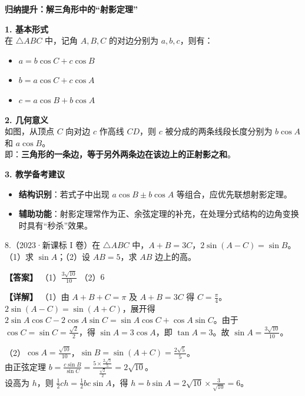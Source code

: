 \documentclass[UTF8,10pt,aspectratio=169]{ctexbeamer}
\begin{document}
	\begin{frame}
		\begin{center}
			{\Large \textbf{归纳提升：解三角形中的“射影定理”}}
		\end{center}
		\vspace{0.4cm}
		
		\textbf{1. 基本形式} \\
		在 $\triangle ABC$ 中，记角 $A, B, C$ 的对边分别为 $a, b, c$，则有：
		\begin{itemize}
			\item $a = b \cos C + c \cos B$
			\item $b = a \cos C + c \cos A$
			\item $c = a \cos B + b \cos A$
		\end{itemize}
		
		\vspace{0.3cm}
		\pause
		\textbf{2. 几何意义} \\
		
		如图，从顶点 $C$ 向对边 $c$ 作高线 $CD$，则 $c$ 被分成的两条线段长度分别为 $b\cos A$ 和 $a\cos B$。\\
		即：\textbf{三角形的一条边，等于另外两条边在该边上的正射影之和}。
		
		\vspace{0.3cm}
		\pause
		\textbf{3. 教学备考建议} \\
		\begin{itemize}
			\item \textbf{结构识别}：若式子中出现 $a\cos B \pm b\cos A$ 等组合，应优先联想射影定理。
			\item \textbf{辅助功能}：射影定理常作为正、余弦定理的补充，在处理分式结构的边角变换时具有“秒杀”效果。
		\end{itemize}
	\end{frame}
	
	\begin{frame}
		8.（2023·新课标 I 卷）在 $\triangle ABC$ 中，$A + B = 3C$，$2\sin(A-C) = \sin B$。\\
		（1）求 $\sin A$；\quad （2）设 $AB = 5$，求 $AB$ 边上的高。
		
		\vspace{0.3cm}
		\pause
		\textbf{【答案】} （1）$\frac{3\sqrt{10}}{10}$ \quad （2）$6$
		
		\vspace{0.2cm}
		\textbf{【详解】} 
		（1）由 $A+B+C=\pi$ 及 $A+B=3C$ 得 $C=\frac{\pi}{4}$。\\
		$2\sin(A-C) = \sin(A+C)$，展开得 $2\sin A\cos C - 2\cos A\sin C = \sin A\cos C + \cos A\sin C$。由于 $\cos C = \sin C = \frac{\sqrt{2}}{2}$，得 $\sin A = 3\cos A$，即 $\tan A = 3$。故 $\sin A = \frac{3\sqrt{10}}{10}$。
		
		（2）$\cos A = \frac{\sqrt{10}}{10}$，$\sin B = \sin(A+C) = \frac{2\sqrt{5}}{5}$。\\
		由正弦定理 $b = \frac{c\sin B}{\sin C} = \frac{5 \times \frac{2\sqrt{5}}{5}}{\frac{\sqrt{2}}{2}} = 2\sqrt{10}$。\\
		设高为 $h$，则 $\frac{1}{2}ch = \frac{1}{2}bc\sin A$，得 $h = b\sin A = 2\sqrt{10} \times \frac{3}{\sqrt{10}} = 6$。
	\end{frame}
	
\end{document}
